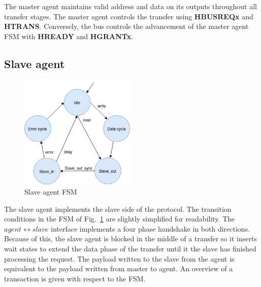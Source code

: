 The master agent maintains valid address and data on its outputs throughout all transfer stages. The master agent controls the transfer using \textbf{HBUSREQx} and \textbf{HTRANS}. Conversely, the bus controls the advancement of the master agent FSM with \textbf{HREADY} and \textbf{HGRANTx}.  


\newpage
\subsection{Slave agent}
\begin{figure}
\includegraphics[width=5.5cm]{figs/hw/sAgent_FSM.png}
\caption{Slave agent FSM}\label{fig:rsfsm}
\end{figure}  

The slave agent implements the slave side of the protocol. The transition conditions in the FSM of Fig.~\ref{fig:rsfsm} are slightly simplified for readability. 
The $agent\leftrightarrow slave$ interface implements a four phase handshake in both directions. Because of this, the slave agent is blocked in the middle of a transfer so it inserts wait states to extend the data phase of the transfer until it the slave has finished processing the request. The payload written to the slave from the agent is equivalent to the payload written from master to agent. An overview of a transaction is given with respect to the FSM.\par
 \vspace{1cm} 

